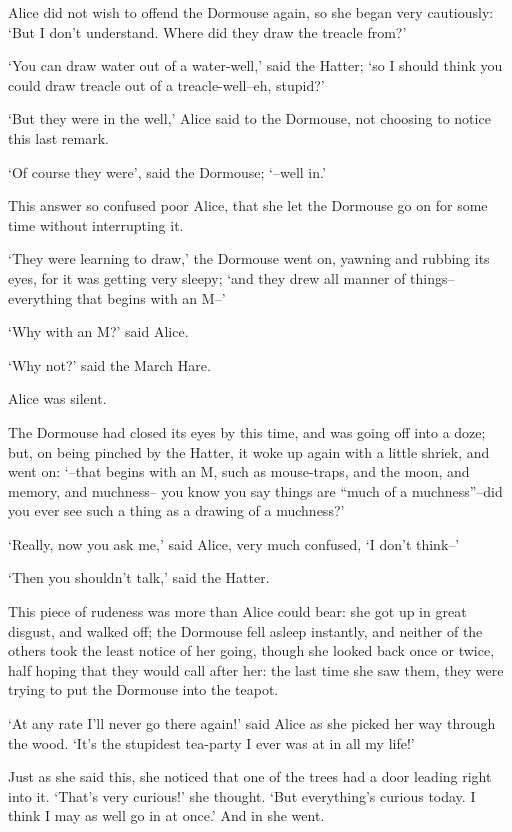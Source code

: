 \documentclass[statementpaper,twoside,openany]{memoir}
\begin{document}
Alice did not wish to offend the Dormouse again, so she began very cautiously: `But I don't understand. Where did they draw the treacle from?'

`You can draw water out of a water-well,' said the Hatter; `so I should think you could draw treacle out of a treacle-well--eh, stupid?'

`But they were in the well,' Alice said to the Dormouse, not choosing to notice this last remark.

`Of course they were', said the Dormouse; `--well in.'

This answer so confused poor Alice, that she let the Dormouse go on for some time without interrupting it.

`They were learning to draw,' the Dormouse went on, yawning and rubbing its eyes, for it was getting very sleepy; `and they drew all manner of things--everything that begins with an M--'

`Why with an M?' said Alice.

`Why not?' said the March Hare.

Alice was silent.

The Dormouse had closed its eyes by this time, and was going off into a doze; but, on being pinched by the Hatter, it woke up again with a little shriek, and went on: `--that begins with an M, such as mouse-traps, and the moon, and memory, and muchness-- you know you say things are ``much of a muchness''--did you ever see such a thing as a drawing of a muchness?'

`Really, now you ask me,' said Alice, very much confused, `I don't think--'

`Then you shouldn't talk,' said the Hatter.

This piece of rudeness was more than Alice could bear: she got up in great disgust, and walked off; the Dormouse fell asleep instantly, and neither of the others took the least notice of her going, though she looked back once or twice, half hoping that they would call after her: the last time she saw them, they were trying to put the Dormouse into the teapot.

`At any rate I'll never go there again!' said Alice as she picked her way through the wood. `It's the stupidest tea-party I ever was at in all my life!'

Just as she said this, she noticed that one of the trees had a door leading right into it. `That's very curious!' she thought. `But everything's curious today. I think I may as well go in at once.' And in she went.
\end{document}
